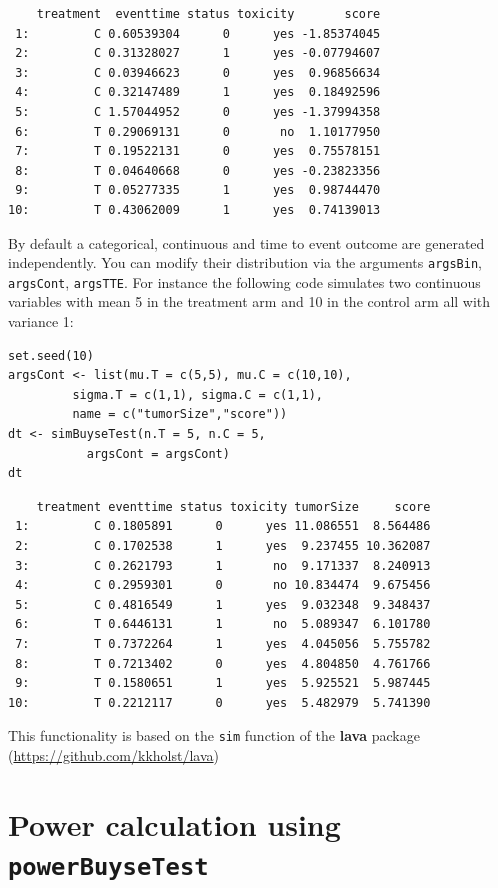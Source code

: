 \documentclass[12pt]{article}
\begin{document}
\begin{verbatim}
    treatment  eventtime status toxicity       score
 1:         C 0.60539304      0      yes -1.85374045
 2:         C 0.31328027      1      yes -0.07794607
 3:         C 0.03946623      0      yes  0.96856634
 4:         C 0.32147489      1      yes  0.18492596
 5:         C 1.57044952      0      yes -1.37994358
 6:         T 0.29069131      0       no  1.10177950
 7:         T 0.19522131      0      yes  0.75578151
 8:         T 0.04640668      0      yes -0.23823356
 9:         T 0.05277335      1      yes  0.98744470
10:         T 0.43062009      1      yes  0.74139013
\end{verbatim}

By default a categorical, continuous and time to event outcome are
generated independently. You can modify their distribution via the
arguments \texttt{argsBin}, \texttt{argsCont}, \texttt{argsTTE}. For instance the following
code simulates two continuous variables with mean 5 in the treatment
arm and 10 in the control arm all with variance 1:
\lstset{language=r,label= ,caption= ,captionpos=b,numbers=none}
\begin{lstlisting}
set.seed(10)
argsCont <- list(mu.T = c(5,5), mu.C = c(10,10), 
		 sigma.T = c(1,1), sigma.C = c(1,1),
		 name = c("tumorSize","score"))
dt <- simBuyseTest(n.T = 5, n.C = 5,
		   argsCont = argsCont)
dt
\end{lstlisting}

\begin{verbatim}
    treatment eventtime status toxicity tumorSize     score
 1:         C 0.1805891      0      yes 11.086551  8.564486
 2:         C 0.1702538      1      yes  9.237455 10.362087
 3:         C 0.2621793      1       no  9.171337  8.240913
 4:         C 0.2959301      0       no 10.834474  9.675456
 5:         C 0.4816549      1      yes  9.032348  9.348437
 6:         T 0.6446131      1       no  5.089347  6.101780
 7:         T 0.7372264      1      yes  4.045056  5.755782
 8:         T 0.7213402      0      yes  4.804850  4.761766
 9:         T 0.1580651      1      yes  5.925521  5.987445
10:         T 0.2212117      0      yes  5.482979  5.741390
\end{verbatim}

This functionality is based on the \texttt{sim} function of the \textbf{lava}
package (\url{https://github.com/kkholst/lava})

\clearpage

\section{Power calculation using \texttt{powerBuyseTest}}
\label{sec:org301cf29}
\end{document}

